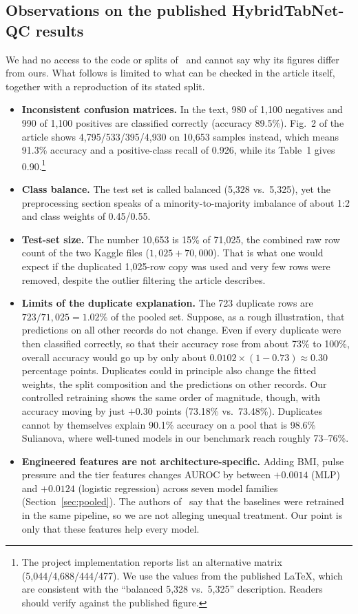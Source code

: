 \documentclass[conference]{IEEEtran}
\newcommand{\htn}{HybridTabNet-QC}
\begin{document}
\subsection{Observations on the published \htn{} results}
We had no access to the code or splits of~\cite{mahmud2026} and cannot say why its figures differ from ours. What follows is limited to what can be checked in the article itself, together with a reproduction of its stated split.
\begin{itemize}
\item \textbf{Inconsistent confusion matrices.} In the text, 980 of 1{,}100 negatives and 990 of 1{,}100 positives are classified correctly (accuracy 89.5\%). Fig.~2 of the article shows 4{,}795/533/395/4{,}930 on 10{,}653 samples instead, which means 91.3\% accuracy and a positive-class recall of 0.926, while its Table~1 gives 0.90.\footnote{The project implementation reports list an alternative matrix (5{,}044/4{,}688/444/477). We use the values from the published LaTeX, which are consistent with the ``balanced 5{,}328 vs.\ 5{,}325'' description. Readers should verify against the published figure.}
\item \textbf{Class balance.} The test set is called balanced (5{,}328 vs.\ 5{,}325), yet the preprocessing section speaks of a minority-to-majority imbalance of about 1:2 and class weights of 0.45/0.55.
\item \textbf{Test-set size.} The number 10{,}653 is 15\% of 71{,}025, the combined raw row count of the two Kaggle files ($1{,}025+70{,}000$). That is what one would expect if the duplicated 1{,}025-row copy was used and very few rows were removed, despite the outlier filtering the article describes.
\item \textbf{Limits of the duplicate explanation.} The 723 duplicate rows are $723/71{,}025=1.02\%$ of the pooled set. Suppose, as a rough illustration, that predictions on all other records do not change. Even if every duplicate were then classified correctly, so that their accuracy rose from about 73\% to 100\%, overall accuracy would go up by only about $0.0102\times(1-0.73)\approx 0.30$ percentage points. Duplicates could in principle also change the fitted weights, the split composition and the predictions on other records. Our controlled retraining shows the same order of magnitude, though, with accuracy moving by just $+0.30$ points (73.18\% vs.\ 73.48\%). Duplicates cannot by themselves explain 90.1\% accuracy on a pool that is 98.6\% Sulianova, where well-tuned models in our benchmark reach roughly 73--76\%.
\item \textbf{Engineered features are not architecture-specific.} Adding BMI, pulse pressure and the tier features changes AUROC by between $+0.0014$ (MLP) and $+0.0124$ (logistic regression) across seven model families (Section~\ref{sec:pooled}). The authors of~\cite{mahmud2026} say that the baselines were retrained in the same pipeline, so we are not alleging unequal treatment. Our point is only that these features help every model.
\end{itemize}
\end{document}
